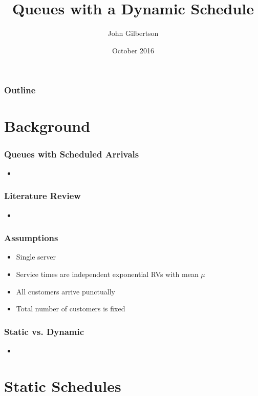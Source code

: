 \documentclass{beamer}
\title{Queues with a Dynamic Schedule}
\author{John Gilbertson}
\date{October 2016}
\begin{document}
\begin{frame}
	\titlepage
\end{frame}

\begin{frame}
	\frametitle{Outline}
	\tableofcontents
\end{frame}

\section{Background}

\begin{frame}
	\frametitle{Queues with Scheduled Arrivals}

	\begin{itemize}
		\item 
	\end{itemize}
\end{frame}

\begin{frame}
	\frametitle{Literature Review}

	\begin{itemize}
		\item 
	\end{itemize}
\end{frame}

\begin{frame}
	\frametitle{Assumptions}

	\begin{itemize}
		\item Single server
		\item Service times are independent exponential RVs with mean $\mu$
		\item All customers arrive punctually
		\item Total number of customers is fixed
	\end{itemize}
\end{frame}

\begin{frame}
	\frametitle{Static vs. Dynamic}

	\begin{itemize}
		\item 
	\end{itemize}
\end{frame}

\section{Static Schedules}
\end{document}
